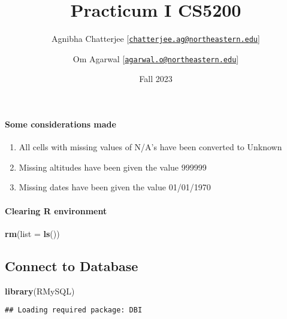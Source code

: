 \documentclass[
]{article}
\title{Practicum I CS5200}
\author{Agnibha Chatterjee
{[}\href{mailto:chatterjee.ag@northeastern.edu}{\nolinkurl{chatterjee.ag@northeastern.edu}}{]} \and Om
Agarwal
{[}\href{mailto:agarwal.o@northeastern.edu}{\nolinkurl{agarwal.o@northeastern.edu}}{]}}
\date{Fall 2023}
\newenvironment{Shaded}{\begin{snugshade}}{\end{snugshade}}
\newcommand{\AttributeTok}[1]{\textcolor[rgb]{0.13,0.29,0.53}{#1}}
\newcommand{\FunctionTok}[1]{\textcolor[rgb]{0.13,0.29,0.53}{\textbf{#1}}}
\newcommand{\NormalTok}[1]{#1}
\providecommand{\tightlist}{%
  \setlength{\itemsep}{0pt}\setlength{\parskip}{0pt}}
\begin{document}
\maketitle

\hypertarget{some-considerations-made}{%
\paragraph{Some considerations made}\label{some-considerations-made}}

\begin{enumerate}
\def\labelenumi{\arabic{enumi}.}
\tightlist
\item
  All cells with missing values of N/A's have been converted to Unknown
\item
  Missing altitudes have been given the value 999999
\item
  Missing dates have been given the value 01/01/1970
\end{enumerate}

\hypertarget{clearing-r-environment}{%
\paragraph{Clearing R environment}\label{clearing-r-environment}}

\begin{Shaded}
\begin{Highlighting}[]
\FunctionTok{rm}\NormalTok{(}\AttributeTok{list =} \FunctionTok{ls}\NormalTok{())}
\end{Highlighting}
\end{Shaded}

\hypertarget{connect-to-database}{%
\subsection{Connect to Database}\label{connect-to-database}}

\begin{Shaded}
\begin{Highlighting}[]
\FunctionTok{library}\NormalTok{(RMySQL)}
\end{Highlighting}
\end{Shaded}

\begin{verbatim}
## Loading required package: DBI
\end{verbatim}
\end{document}

